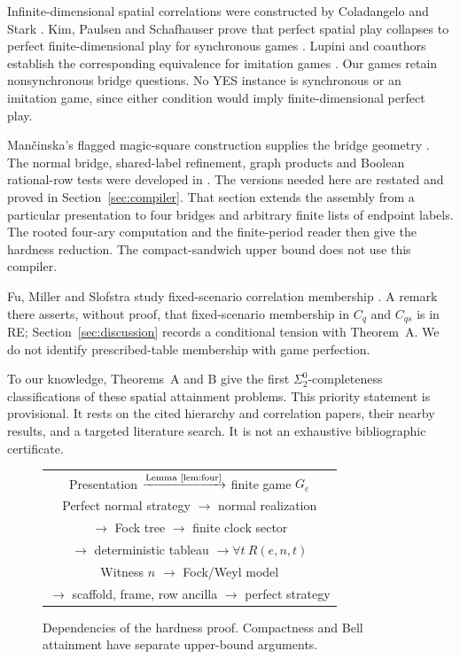 Infinite-dimensional spatial correlations were constructed by Coladangelo and Stark \cite{CS}. Kim, Paulsen and Schafhauser prove that perfect spatial play collapses to perfect finite-dimensional play for synchronous games \cite[Corollary 3.11]{KPS}. Lupini and coauthors establish the corresponding equivalence for imitation games \cite[Corollary~5.4]{Imitation}. Our games retain nonsynchronous bridge questions. No YES instance is synchronous or an imitation game, since either condition would imply finite-dimensional perfect play.

Man\v{c}inska's flagged magic-square construction supplies the bridge geometry \cite{Mancinska}. The normal bridge, shared-label refinement, graph products and Boolean rational-row tests were developed in \cite[Lemmas~4.1 and 4.2, Theorem~B, Eq.~(32)]{Entropy}. The versions needed here are restated and proved in Section~\ref{sec:compiler}. That section extends the assembly from a particular presentation to four bridges and arbitrary finite lists of endpoint labels. The rooted four-ary computation and the finite-period reader then give the hardness reduction. The compact-sandwich upper bound does not use this compiler.

Fu, Miller and Slofstra study fixed-scenario correlation membership \cite{FMS}. A remark there asserts, without proof, that fixed-scenario membership in $C_q$ and $C_{qs}$ is in RE; Section~\ref{sec:discussion} records a conditional tension with Theorem~A. We do not identify prescribed-table membership with game perfection.

To our knowledge, Theorems~A and B give the first $\Sigma^0_2$-completeness classifications of these spatial attainment problems. This priority statement is provisional. It rests on the cited hierarchy and correlation papers, their nearby results, and a targeted literature search. It is not an exhaustive bibliographic certificate.

\begin{figure}[ht]
\centering\small
\begin{tabular}{@{}c@{}}
Presentation $\xrightarrow{\text{Lemma~\ref{lem:four}}}$ finite game $G_e$\\[4pt]
Perfect normal strategy $\longrightarrow$ normal realization\\[2pt]
$\longrightarrow$ Fock tree $\longrightarrow$ finite clock sector\\[2pt]
$\longrightarrow$ deterministic tableau $\longrightarrow\forall t\ R(e,n,t)$\\[4pt]
Witness $n$ $\longrightarrow$ Fock/Weyl model\\[2pt]
$\longrightarrow$ scaffold, frame, row ancilla $\longrightarrow$ perfect strategy
\end{tabular}
\caption{Dependencies of the hardness proof. Compactness and Bell
attainment have separate upper-bound arguments.}\label{fig:dependencies}
\end{figure}

